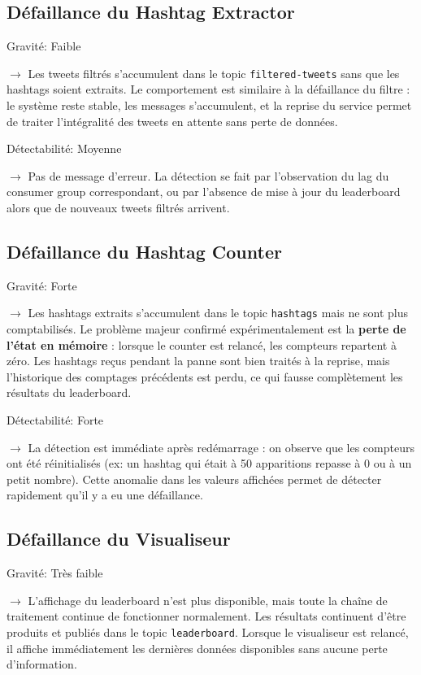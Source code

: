 \documentclass[10pt,a4paper]{article}
\begin{document}
\subsection{Défaillance du Hashtag Extractor}

Gravité: Faible

$\rightarrow$ Les tweets filtrés s'accumulent dans le topic \texttt{filtered-tweets} sans que les hashtags soient extraits. Le comportement est similaire à la défaillance du filtre : le système reste stable, les messages s'accumulent, et la reprise du service permet de traiter l'intégralité des tweets en attente sans perte de données.

Détectabilité: Moyenne

$\rightarrow$ Pas de message d'erreur. La détection se fait par l'observation du lag du consumer group correspondant, ou par l'absence de mise à jour du leaderboard alors que de nouveaux tweets filtrés arrivent.

\subsection{Défaillance du Hashtag Counter}

Gravité: Forte

$\rightarrow$ Les hashtags extraits s'accumulent dans le topic \texttt{hashtags} mais ne sont plus comptabilisés. Le problème majeur confirmé expérimentalement est la \textbf{perte de l'état en mémoire} : lorsque le counter est relancé, les compteurs repartent à zéro. Les hashtags reçus pendant la panne sont bien traités à la reprise, mais l'historique des comptages précédents est perdu, ce qui fausse complètement les résultats du leaderboard.

Détectabilité: Forte

$\rightarrow$ La détection est immédiate après redémarrage : on observe que les compteurs ont été réinitialisés (ex: un hashtag qui était à 50 apparitions repasse à 0 ou à un petit nombre). Cette anomalie dans les valeurs affichées permet de détecter rapidement qu'il y a eu une défaillance.

\subsection{Défaillance du Visualiseur}

Gravité: Très faible

$\rightarrow$ L'affichage du leaderboard n'est plus disponible, mais toute la chaîne de traitement continue de fonctionner normalement. Les résultats continuent d'être produits et publiés dans le topic \texttt{leaderboard}. Lorsque le visualiseur est relancé, il affiche immédiatement les dernières données disponibles sans aucune perte d'information.
\end{document}

